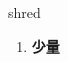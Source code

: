 
\begin{frame}
{\huge shred}
\begin{center}
\begin{enumerate}\Large
  \item \textbf{少量}
\end{enumerate}
\end{center}
\end{frame}
